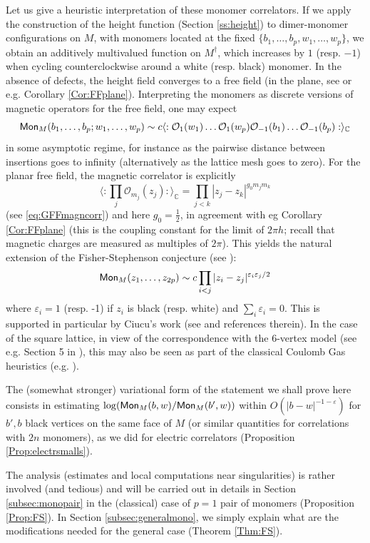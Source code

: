 \documentclass[10pt]{article}
\newcommand{\C}{\mathbb{C}}
\newcommand{\mc}{\mathcal}
\newcommand{\eps}{\varepsilon}
\newcommand{\dg}{\dagger}
\newcommand{\Mon}{{\sf Mon}}
\begin{document}
Let us give a heuristic interpretation of these monomer correlators. If we apply the construction of the height function (Section \ref{ss:height}) to dimer-monomer configurations on $M$, with monomers located at the fixed $\{b_1,\dots,b_p,w_1,\dots,w_p\}$, we obtain an additively multivalued function on $M^\dg$, which increases by $1$ (resp. $-1$) when cycling counterclockwise around a white (resp. black) monomer. In the absence of defects, the height field converges to a free field (in the plane, see \cite{dT_isoradial} or e.g. Corollary \ref{Cor:FFplane}). Interpreting the monomers as discrete versions of magnetic operators for the free field, one may expect
$$\Mon_{M}(b_1,\dots,b_p;w_1,\dots,w_p)\sim c\langle:{\mc O}_{1}(w_1)\dots{\mc O}_{1}(w_p){\mc O}_{-1}(b_1)\dots{\mc O}_{-1}(b_p):\rangle_\C$$
in some asymptotic regime, for instance as the pairwise distance between insertions goes to infinity (alternatively as the lattice mesh goes to zero). For the planar free field, the magnetic correlator is explicitly
$$\langle :\prod_j{\mc O}_{m_j}(z_j):\rangle_\C=\prod_{j<k}|z_j-z_k|^{g_0m_jm_k}$$
(see \eqref{eq:GFFmagncorr}) and here $g_0=\frac 12$, in agreement with eg Corollary \ref{Cor:FFplane} (this is the coupling constant for the limit of $2\pi h$; 
recall that magnetic charges are measured as multiples of $2\pi$). This yields the natural extension of the Fisher-Stephenson conjecture (see \cite{Ciucu_PNAS}):
$$\Mon_{M}(z_1,\dots,z_{2p})\sim c\prod _{i<j}|z_i-z_j|^{\eps_i\eps_j/2}$$
where $\eps_i=1$ (resp. -1) if $z_i$ is black (resp. white) and $\sum_i\eps_i=0$. This is supported in particular by Ciucu's work (see \cite{Ciucu_PNAS,Ciucu_TAMS} and references therein). In the case of the square lattice, in view of the correspondence with the 6-vertex model (see e.g. Section 5 in \cite{Dub_abelian}), this may also be seen as part of the classical Coulomb Gas heuristics (e.g. \cite{NieKno_potts,Nien_Coulomb,DiFSalZub_coulomb}).

The (somewhat stronger) variational form of the statement we shall prove here consists in estimating $\log(\Mon_M(b,w)/\Mon_M(b',w))$ within $O(|b-w|^{-1-\eps})$ for $b',b$ black vertices on the same face of $M$ (or similar quantities for correlations with $2n$ monomers), as we did for electric correlators (Proposition \ref{Prop:electrsmalls}).

The analysis (estimates and local computations near singularities) is rather involved (and tedious) and will be carried out in details in Section \ref{subsec:monopair} in the (classical) case of $p=1$ pair of monomers (Proposition \ref{Prop:FS}). In Section \ref{subsec:generalmono}, we simply explain what are the modifications needed for the general case (Theorem \ref{Thm:FS}).
\end{document}
